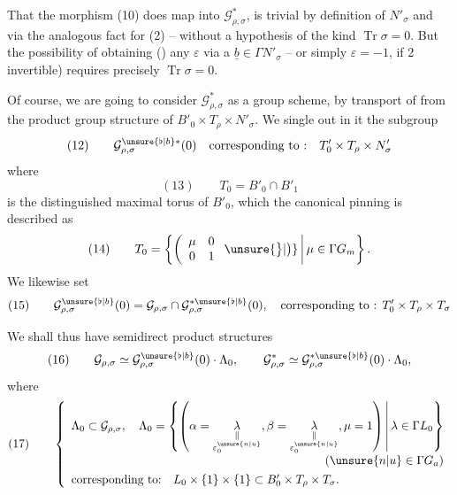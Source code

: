 
That the morphism (10) does map into $\mathcal G_{\rho,\sigma}^{*}$,
is trivial by definition of $N'_\sigma$ and via the analogous fact for (2)
-- without a hypothesis of the kind $\operatorname{Tr}\sigma=0$.
But the possibility of obtaining ()
any $\varepsilon$ via a $\underline b\in\Gamma N'_\sigma$
-- or simply $\varepsilon=-1$, if 2 invertible) requires precisely
$\operatorname{Tr}\sigma=0$.

Of course, we are going to consider $\mathcal G_{\rho,\sigma}^{*}$ as a group scheme,
by transport of  from the product group structure of
$B'_0\times T_\rho\times N'_\sigma$.
We single out in it the subgroup
\[
(12)\qquad \mathcal G_{\rho,\sigma}^{\unsure{\flat|b}*}(0)
\quad\text{corresponding to :}\quad T'_0\times T_\rho\times N'_\sigma
\]
where
\[
(13)\qquad T_0=B'_0\cap B'_1
\]
is the distinguished maximal torus of $B'_0$, which
 the canonical pinning is described as
\[
(14)\qquad T_0=\left\{\left(\begin{array}{cc}\mu&0\\0&1\end{array}\right.\unsure{\big\}|\big)}
\,\middle|\,\mu\in\Gamma\mathbb \mathbb G_m\right\}.
\]
We likewise set
\[
(15)\qquad \mathcal G_{\rho,\sigma}^{\unsure{\flat|b}}(0)
=\mathcal G_{\rho,\sigma}\cap\mathcal G_{\rho,\sigma}^{*\unsure{\flat|b}}(0),
\quad\text{corresponding to : }T'_0\times T_\rho\times T_\sigma
\]




We shall thus have semidirect product structures
\[
(16)\qquad
\mathcal G_{\rho,\sigma}\simeq
\mathcal G_{\rho,\sigma}^{\unsure{\flat|b}}(0)\cdot\Lambda_0,
\qquad
\mathcal G_{\rho,\sigma}^{*}\simeq
\mathcal G_{\rho,\sigma}^{*\unsure{\flat|b}}(0)\cdot\Lambda_0,
\]
where
\[
(17)\qquad
\left\{\begin{array}{l}
\displaystyle\Lambda_0\subset\mathcal G_{\rho,\sigma},\quad
\Lambda_0=\left\{\left(
\alpha=\underset{\substack{\Vert\\\varepsilon_0^{\unsure{n|u}}}}{\lambda},
\beta=\underset{\substack{\Vert\\\varepsilon_0^{\unsure{n|u}}}}{\lambda},
\mu=1\right)\,\middle|\,\lambda\in\Gamma L_0\right\}\\
\hfill(\unsure{n|u}\in\Gamma\mathbb \mathbb G_a)\\[4pt]
\text{corresponding to:}\quad L_0\times\{1\}\times\{1\}
\subset B'_0\times T_\rho\times T_\sigma.
\end{array}\right.
\]

